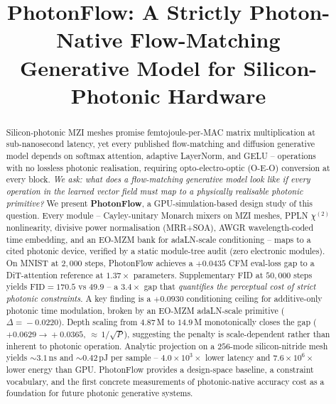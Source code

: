 \documentclass[conference]{IEEEtran}
\begin{document}
\title{PhotonFlow: A Strictly Photon-Native Flow-Matching\\Generative
       Model for Silicon-Photonic Hardware}

\author{
%
}

\maketitle

\begin{abstract}
Silicon-photonic MZI meshes promise femtojoule-per-MAC matrix
multiplication at sub-nanosecond latency, yet every published
flow-matching and diffusion generative model depends on softmax
attention, adaptive LayerNorm, and GELU -- operations with no
lossless photonic realisation, requiring opto-electro-optic (O-E-O)
conversion at every block.  \emph{We ask: what does a
flow-matching generative model look like if every operation in the
learned vector field must map to a physically realisable photonic
primitive?}  We present \textbf{PhotonFlow}, a GPU-simulation-based
design study of this question.  Every module -- Cayley-unitary
Monarch mixers on MZI meshes, PPLN $\chi^{(2)}$ nonlinearity,
divisive power normalisation (MRR+SOA), AWGR wavelength-coded time
embedding, and an EO-MZM bank for adaLN-scale conditioning -- maps
to a cited photonic device, verified by a static module-tree audit
(zero electronic modules).  On MNIST at $2{,}000$ steps, PhotonFlow
achieves a $+0.0435$ CFM eval-loss gap to a DiT-attention reference
at $1.37{\times}$ parameters.  Supplementary FID at $50{,}000$ steps
yields $\mathrm{FID}{=}170.5$ vs $49.9$ -- a $3.4{\times}$ gap that
\emph{quantifies the perceptual cost of strict photonic constraints}.
A key finding is a $+0.0930$ conditioning ceiling for additive-only
photonic time modulation, broken by an EO-MZM adaLN-scale primitive
($\Delta\!=\!{-}0.0220$).  Depth scaling from $4.87$\,M to
$14.9$\,M monotonically closes the gap
($+0.0629\!\to\!+0.0365$, ${\approx}\,1/\sqrt{P}$), suggesting the
penalty is scale-dependent rather than inherent to photonic
operation.  Analytic projection on a $256$-mode silicon-nitride mesh
yields $\sim\!3.1$\,ns and $\sim\!0.42$\,pJ per sample --
$4.0{\times}10^3\times$ lower latency and $7.6{\times}10^6\times$
lower energy than GPU.  PhotonFlow provides a design-space baseline,
a constraint vocabulary, and the first concrete measurements of
photonic-native accuracy cost as a foundation for future photonic
generative systems.
\end{abstract}
\end{document}
